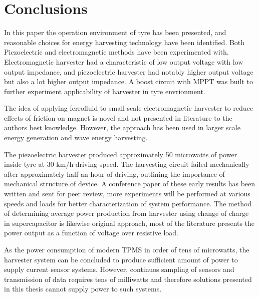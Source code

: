 \section{Conclusions}
In this paper the operation environment of tyre has been presented, and reasonable choices for energy harvesting technology have been identified. Both Piezoelectric and electromagnetic methods have been experimented with. Electromagnetic harvester had a characteristic of low output voltage with low output impedance, and piezoelectric harvester had notably higher output voltage but also a lot higher output impedance. A boost circuit with MPPT was built to further experiment applicability of harvester in tyre envrionment. 

The idea of applying ferrofluid to small-scale electromagnetic harvester to reduce effects of friction on magnet is novel and not presented in literature to the authors best knowledge. However, the approach has been used in larger scale energy generation and wave energy harvesting. 

The piezoelectric harvester produced approximately 50 microwatts of power inside tyre at 30 km/h driving speed. The harvesting circuit failed mechanically after approximately half an hour of driving, outlining the importance of mechanical structure of device. A conference paper of these early results has been written and sent for peer review, more experiments will be performed at various speeds and loads for better characterization of system performance. The method of determining average power production from harvester using change of charge in supercapacitor is likewise original approach, most of the literature presents the power output as a function of voltage over resistive load.  

As the power consumption of modern TPMS in order of tens of microwatts, the harvester system can be concluded to produce sufficient amount of power to supply current sensor systems. However, continuos sampling of sensors and transmission of data requires tens of milliwatts and therefore solutions presented in this thesis cannot supply power to such systems. 
